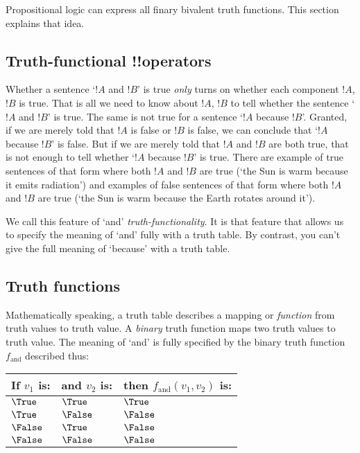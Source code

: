 \documentclass[../../../include/open-logic-section]{subfiles}
\begin{document}


Propositional logic can express all finary bivalent truth functions. 
This section explains that idea.

\subsection{Truth-functional !!{operator}s}

Whether a sentence `$!A$ and $!B$' is true \emph{only} turns on whether
each component $!A$, $!B$ is true. That is all we need to know about
$!A$, $!B$ to tell whether the sentence `$!A$ and $!B$' is true. The 
same is not true for a sentence `$!A$ because $!B$'. Granted, if we
are merely told that $!A$ is false or $!B$ is false, we can conclude
that `$!A$ because $!B$' is false. But if we are merely told that $!A$
and $!B$ are both true, that is not enough to tell whether `$!A$ because $!B$'
is true. There are example of true sentences of that form where both $!A$ 
and $!B$ are true (`the Sun is warm because it emits radiation') 
and examples of false sentences of that form where both $!A$ 
and $!B$ are true (`the Sun is warm because the Earth rotates around it').

We call this feature of `and' \emph{truth-functionality}. It is that 
feature that allows us to specify the meaning of `and' fully with
a truth table. By contrast, you can't give the full meaning of `because'
with a truth table. 

\subsection{Truth functions}

Mathematically speaking, a truth table describes 
a mapping or \emph{function} from truth values to truth value. 
A \emph{binary} truth function maps two truth values to truth value.
The meaning of `and' is fully specified by the binary truth function 
$f_{\text{and}}$ described thus:

\smallskip
\begin{tabular}{lll}
    If $v_1$ is: & and $v_2$ is: & then $f_{\text{and}}(v_1,v_2)$ is: \\
    \hline
    $\True$ & $\True$ & $\True$ \\
    $\True$ & $\False$ & $\False$ \\
    $\False$ & $\True$ & $\False$ \\
    $\False$ & $\False$ & $\False$ \\
\end{tabular}
\smallskip
\end{document}
